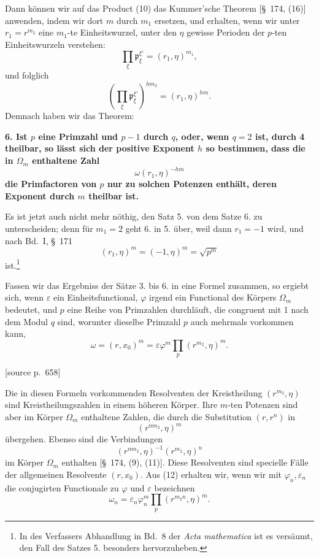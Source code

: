 \documentclass[11pt]{article}
\newcommand{\pp}{\mathfrak p}
\newcommand{\eps}{\varepsilon}
\newcommand{\srcpage}[1]{\par\medskip\noindent\textsf{[source p.~#1]}\par\smallskip}
\begin{document}
Dann können wir auf das Product (10) das Kummer'sche Theorem [\S~174, (16)] anwenden, indem wir dort $m$ durch $m_1$ ersetzen, und erhalten, wenn wir unter $r_1=r^{m_2}$ eine $m_1$-te Einheitswurzel, unter den $\eta$ gewisse Perioden der $p$-ten Einheitswurzeln verstehen:
\[
  \prod_\xi\pp_\xi^{\xi'}=(r_1,\eta)^{m_1},
\]
und folglich
\begin{equation}
  \left(\prod_\xi\pp_\xi^{\xi'}\right)^{hm_2}=(r_1,\eta)^{hm}.
\tag{11}
\end{equation}
Demnach haben wir das Theorem:

\textbf{6. Ist $p$ eine Primzahl und $p-1$ durch $q$, oder, wenn $q=2$ ist, durch 4 theilbar, so lässt sich der positive Exponent $h$ so bestimmen, dass die in $\Omega_m$ enthaltene Zahl}
\[
  \omega(r_1,\eta)^{-hm}
\]
\textbf{die Primfactoren von $p$ nur zu solchen Potenzen enthält, deren Exponent durch $m$ theilbar ist.}

Es ist jetzt auch nicht mehr nöthig, den Satz 5. von dem Satze 6. zu unterscheiden; denn für $m_1=2$ geht 6. in 5. über, weil dann $r_1=-1$ wird, und nach Bd.~I, \S~171
\[
  (r_1,\eta)^m=(-1,\eta)^m=\sqrt{p^m}
\]
ist.\footnote{In des Verfassers Abhandlung in Bd.~8 der \textit{Acta mathematica} ist es versäumt, den Fall des Satzes 5. besonders hervorzuheben.}

Fassen wir das Ergebniss der Sätze 3. bis 6. in eine Formel zusammen, so ergiebt sich, wenn $\eps$ ein Einheitsfunctional, $\varphi$ irgend ein Functional des Körpers $\Omega_m$ bedeutet, und $p$ eine Reihe von Primzahlen durchläuft, die congruent mit 1 nach dem Modul $q$ sind, worunter dieselbe Primzahl $p$ auch mehrmals vorkommen kann,
\begin{equation}
  \omega=(r,x_0)^m=\eps\varphi^m\prod_p(r^{m_2},\eta)^m.
\tag{12}
\end{equation}

\srcpage{658}
Die in diesen Formeln vorkommenden Resolventen der Kreistheilung $(r^{m_2},\eta)$ sind Kreistheilungszahlen in einem höheren Körper. Ihre $m$-ten Potenzen sind aber im Körper $\Omega_m$ enthaltene Zahlen, die durch die Substitution $(r,r^n)$ in
\[
  (r^{nm_2},\eta)^m
\]
übergehen. Ebenso sind die Verbindungen
\begin{equation}
  (r^{nm_2},\eta)^{-1}(r^{m_2},\eta)^n
\tag{13}
\end{equation}
im Körper $\Omega_m$ enthalten [\S~174, (9), (11)]. Diese Resolventen sind specielle Fälle der allgemeinen Resolvente $(r,x_0)$. Aus (12) erhalten wir, wenn wir mit $\varphi_n,\eps_n$ die conjugirten Functionale zu $\varphi$ und $\eps$ bezeichnen
\begin{equation}
  \omega_n=\eps_n\varphi_n^m\prod_p(r^{m_2 n},\eta)^m.
\tag{14}
\end{equation}
\end{document}

